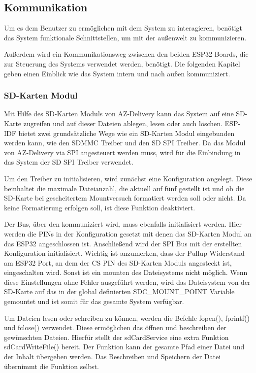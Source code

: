 \subsection{Kommunikation}
Um es dem Benutzer zu ermöglichen mit dem System zu interagieren, benötigt das System funktionale Schnittstellen, um mit der außenwelt zu kommunizieren.

Außerdem wird ein Kommunikationsweg zwischen den beiden ESP32 Boards, die zur Steuerung des Systems verwendet werden, benötigt.
Die folgenden Kapitel geben einen Einblick wie das System intern und nach außen kommuniziert.

\subsubsection{SD-Karten Modul}
Mit Hilfe des SD-Karten Moduls von AZ-Delivery kann das System auf eine SD-Karte zugreifen und auf dieser Dateien ablegen, lesen oder auch löschen.
ESP-IDF bietet zwei grundsätzliche Wege wie ein SD-Karten Modul eingebunden werden kann, wie den SDMMC Treiber und den SD SPI Treiber. Da das Modul von AZ-Delivery via SPI angesteuert werden muss, wird für die Einbindung in das System der SD SPI Treiber verwendet.

Um den Treiber zu initialisieren, wird zunächst eine Konfiguration angelegt. Diese beinhaltet die maximale Dateianzahl, die aktuell auf fünf gestellt ist und ob die SD-Karte bei gescheitertem Mountversuch formatiert werden soll oder nicht.
Da keine Formatierung erfolgen soll, ist diese Funktion deaktiviert.

Der Bus, über den kommuniziert wird, muss ebenfalls initialisiert werden. Hier werden die PINs in der Konfiguration gesetzt mit denen das SD-Karten Modul an das ESP32 angeschlossen ist.
Anschließend wird der SPI Bus mit der erstellten Konfiguration initialisiert. Wichtig ist anzumerken, dass der Pullup Widerstand am ESP32 Port, an dem der CS PIN des SD-Karten Moduls angesteckt ist, eingeschalten wird. Sonst ist ein mounten des Dateisystems nicht möglich.
Wenn diese Einstellungen ohne Fehler ausgeführt werden, wird das Dateisystem von der SD-Karte auf das in der global definierten \glqq SDC\_MOUNT\_POINT\grqq{} Variable gemountet und ist somit für das gesamte System verfügbar.

Um Dateien lesen oder schreiben zu können, werden die Befehle \glqq fopen()\grqq{}, \glqq fprintf()\grqq{} und \glqq fclose()\grqq{} verwendet. Diese ermöglichen das öffnen und beschreiben der gewünschten Dateien. Hierfür stellt der \glqq sdCardService\grqq{} eine extra Funktion \glqq sdCardWriteFile()\grqq{} bereit.
Der Funktion kann der gesamte Pfad einer Datei und der Inhalt übergeben werden. Das Beschreiben und Speichern der Datei übernimmt die Funktion selbst.

